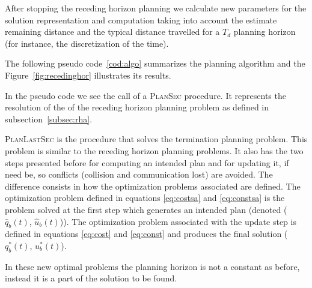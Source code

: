 \documentclass[eprint]{actapoly}
\begin{document}
After stopping the receding horizon planning we calculate new parameters for the 
solution representation and computation taking into
account the estimate remaining distance and the typical distance travelled
for a $T_d$ planning horizon (for instance, the discretization of the time).

The following pseudo code~\ref{cod:algo} summarizes the planning algorithm
and the Figure~\ref{fig:recedinghor} illustrates its results.

In the pseudo code we see the call of a {\scshape PlanSec} procedure.
It represents the resolution of the of the receding horizon planning problem
as defined in subsection~\ref{subsec:rha}.

{\scshape PlanLastSec} is the procedure that solves the termination planning
problem. This problem is similar to the receding horizon planning problems.
It also has the two steps presented before for computing an intended plan and
for updating it, if need be, so conflicts (collision and communication lost)
are avoided. The difference consists in how the optimization problems associated
are defined. The optimization problem defined in equations \ref{eq:costsa} and
\ref{eq:constsa} is the problem solved at the first step which generates an
intended plan (denoted ($\hat{q}_b(t)$, $\hat{u}_b(t)$)). The optimization
problem associated with the update step is defined in equations 
\ref{eq:cost} and \ref{eq:const} and produces the final solution ($q^*_b(t)$, $u^*_b(t)$).

In these new optimal problems the planning horizon is not a constant as before, instead it is a part of the solution to be found.
\end{document}
